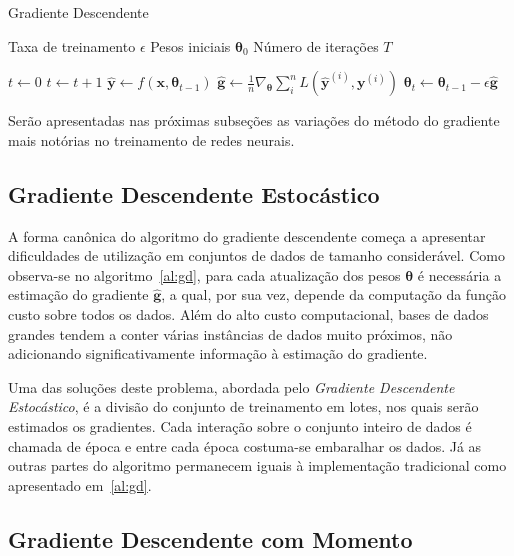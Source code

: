 \begin{algorithm}
    \caption{Gradiente Descendente}
    \label{al:gd}
    \begin{algorithmic}
        \Require Taxa de treinamento $\epsilon$
        \Require Pesos iniciais $\boldsymbol{\theta}_{0}$
        \Require Número de iterações $T$

        \State $t \gets 0$
            \State $t \gets t + 1$
            \State $\mathbf{\hat{y}} \gets f(\mathbf{x}, \boldsymbol{\theta}_{t-1})$
            \State $\mathbf{\hat{g}} \gets \frac{1}{n} \nabla_{\boldsymbol{\theta}} \sum_i^n L(\mathbf{\hat{y}}^{(i)}, \mathbf{y}^{(i)})$
            \State $\boldsymbol{\theta}_{t} \gets \boldsymbol{\theta}_{t-1} - \epsilon \mathbf{\hat{g}}$
        \EndWhile
    \end{algorithmic}
\end{algorithm}

Serão apresentadas nas próximas subseções as variações do método do gradiente mais notórias no treinamento de redes neurais.

\subsection{Gradiente Descendente Estocástico}

A forma canônica do algoritmo do gradiente descendente começa a apresentar dificuldades de utilização em conjuntos de dados de tamanho considerável. Como observa-se no algoritmo~\ref{al:gd}, para cada atualização dos pesos $\boldsymbol{\theta}$ é necessária a estimação do gradiente $\mathbf{\hat{g}}$, a qual, por sua vez, depende da computação da função custo sobre todos os dados. Além do alto custo computacional, bases de dados grandes tendem a conter várias instâncias de dados muito próximos, não adicionando significativamente informação à estimação do gradiente.

Uma das soluções deste problema, abordada pelo \textit{Gradiente Descendente Estocástico}, é a divisão do conjunto de treinamento em lotes, nos quais serão estimados os gradientes. Cada interação sobre o conjunto inteiro de dados é chamada de época e entre cada época costuma-se embaralhar os dados. Já as outras partes do algoritmo permanecem iguais à implementação tradicional como apresentado em~\ref{al:gd}.

\subsection{Gradiente Descendente com Momento}

